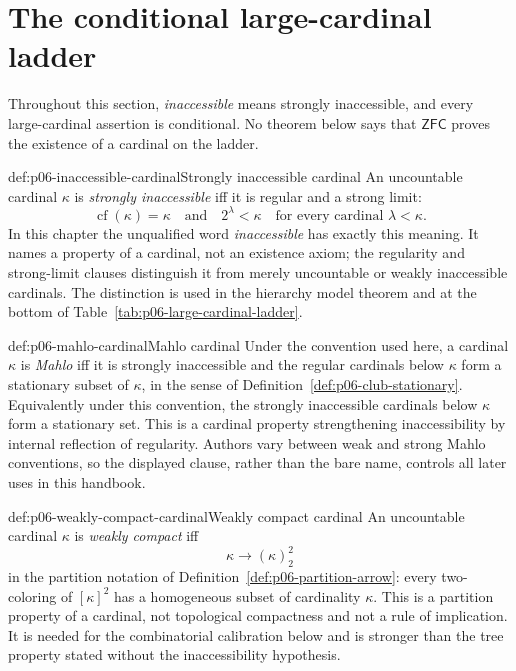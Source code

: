 \section{The conditional large-cardinal ladder}
\label{sec:p06-large-cardinal-ladder}

Throughout this section, \emph{inaccessible} means strongly inaccessible, and
every large-cardinal assertion is conditional.  No theorem below says that
\(\mathsf{ZFC}\) proves the existence of a cardinal on the ladder.

\begin{hbdefinition}{def:p06-inaccessible-cardinal}{Strongly inaccessible cardinal}
An uncountable cardinal \(\kappa\) is \emph{strongly inaccessible} iff it is
regular and a strong limit:
\[
  \operatorname{cf}(\kappa)=\kappa
  \quad\text{and}\quad
  2^\lambda<\kappa\quad\text{for every cardinal }\lambda<\kappa.
\]
In this chapter the unqualified word \emph{inaccessible} has exactly this
meaning.  It names a property of a cardinal, not an existence axiom; the
regularity and strong-limit clauses distinguish it from merely uncountable or
weakly inaccessible cardinals.  The distinction is used in the hierarchy
model theorem and at the bottom of Table~\ref{tab:p06-large-cardinal-ladder}.
\end{hbdefinition}

\begin{hbdefinition}{def:p06-mahlo-cardinal}{Mahlo cardinal}
Under the convention used here, a cardinal \(\kappa\) is \emph{Mahlo} iff it
is strongly inaccessible and the regular cardinals below \(\kappa\) form a
stationary subset of \(\kappa\), in the sense of
Definition~\ref{def:p06-club-stationary}.  Equivalently under this convention,
the strongly inaccessible cardinals below \(\kappa\) form a stationary set.
This is a cardinal property strengthening inaccessibility by internal
reflection of regularity.  Authors vary between weak and strong Mahlo
conventions, so the displayed clause, rather than the bare name, controls all
later uses in this handbook.
\end{hbdefinition}

\begin{hbdefinition}{def:p06-weakly-compact-cardinal}{Weakly compact cardinal}
An uncountable cardinal \(\kappa\) is \emph{weakly compact} iff
\[
  \kappa\longrightarrow(\kappa)^2_2
\]
in the partition notation of Definition~\ref{def:p06-partition-arrow}: every
two-coloring of \([\kappa]^2\) has a homogeneous subset of cardinality
\(\kappa\).  This is a partition property of a cardinal, not topological
compactness and not a rule of implication.  It is needed for the combinatorial
calibration below and is stronger than the tree property stated without the
inaccessibility hypothesis.
\end{hbdefinition}


